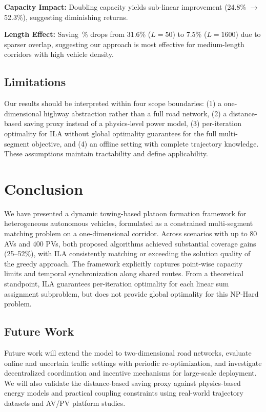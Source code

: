 \documentclass[conference]{IEEEtran}
\begin{document}
\textbf{Capacity Impact:} Doubling capacity yields sub-linear improvement (24.8\% $\rightarrow$ 52.3\%), suggesting diminishing returns.

\textbf{Length Effect:} Saving~\% drops from 31.6\% ($L\!=\!50$) to 7.5\% ($L\!=\!1600$) due to sparser overlap, suggesting our approach is most effective for medium-length corridors with high vehicle density.

\subsection{Limitations}

Our results should be interpreted within four scope boundaries: (1) a one-dimensional highway abstraction rather than a full road network, (2) a distance-based saving proxy instead of a physics-level power model, (3) per-iteration optimality for ILA without global optimality guarantees for the full multi-segment objective, and (4) an offline setting with complete trajectory knowledge. These assumptions maintain tractability and define applicability.

\section{Conclusion}
\label{sec:conclusion}

We have presented a dynamic towing-based platoon formation framework for heterogeneous autonomous vehicles, formulated as a constrained multi-segment matching problem on a one-dimensional corridor. Across scenarios with up to 80 AVs and 400 PVs, both proposed algorithms achieved substantial coverage gains (25–52\%), with ILA consistently matching or exceeding the solution quality of the greedy approach. The framework explicitly captures point-wise capacity limits and temporal synchronization along shared routes. From a theoretical standpoint, ILA guarantees per-iteration optimality for each linear sum assignment subproblem, but does not provide global optimality for this NP-Hard problem.

\subsection{Future Work}
\label{sec:future}

Future work will extend the model to two-dimensional road networks, evaluate online and uncertain traffic settings with periodic re-optimization, and investigate decentralized coordination and incentive mechanisms for large-scale deployment. We will also validate the distance-based saving proxy against physics-based energy models and practical coupling constraints using real-world trajectory datasets and AV/PV platform studies.
\end{document}
